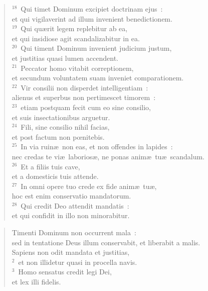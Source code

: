 \begin{flushleft}\begin{verse}${}^{18}$~Qui timet Dominum excipiet doctrinam ejus~:\\ et qui vigilaverint ad illum invenient benedictionem.\\
${}^{19}$~Qui qu\ae rit legem replebitur ab ea,\\ et qui insidiose agit scandalizabitur in ea.\\
${}^{20}$~Qui timent Dominum invenient judicium justum,\\ et justitias quasi lumen accendent.\\
${}^{21}$~Peccator homo vitabit correptionem,\\ et secundum voluntatem suam inveniet comparationem.\\
${}^{22}$~Vir consilii non disperdet intelligentiam~:\\ alienus et superbus non pertimescet timorem~:\\
${}^{23}$~etiam postquam fecit cum eo sine consilio,\\ et suis insectationibus arguetur.\\
${}^{24}$~Fili, sine consilio nihil facias,\\ et post factum non pœnitebis.\\
${}^{25}$~In via ruin\ae\ non eas, et non offendes in lapides~:\\ nec credas te vi\ae\ laborios\ae , ne ponas anim\ae\ tu\ae\ scandalum.\\
${}^{26}$~Et a filiis tuis cave,\\ et a domesticis tuis attende.\\
${}^{27}$~In omni opere tuo crede ex fide anim\ae\ tu\ae ,\\ hoc est enim conservatio mandatorum.\\
${}^{28}$~Qui credit Deo attendit mandatis~:\\ et qui confidit in illo non minorabitur.\end{verse}\end{flushleft}


\begin{flushleft}\begin{verse}\vspace{-19pt}\hspace{6pt}Timenti Dominum non occurrent mala~:\\\hspace{6pt} sed in tentatione Deus illum conservabit, et liberabit a malis.\\ Sapiens non odit mandata et justitias,\\
${}^{2}$~et non illidetur quasi in procella navis.\\
${}^{3}$~Homo sensatus credit legi Dei,\\ et lex illi fidelis.\end{verse}\end{flushleft}


